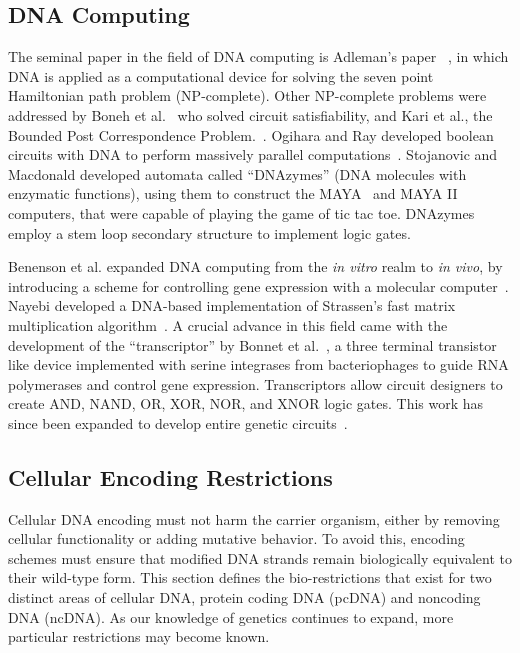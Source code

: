 \documentclass{bioinfo}
\begin{document}
\subsection{DNA Computing}

The seminal paper in the field of DNA computing is Adleman's paper ~\cite{ADLEMAN1994}, in which DNA is applied as a computational device for solving the seven point Hamiltonian path problem (NP-complete). Other NP-complete problems were addressed by Boneh et al.~\cite{BONEH1996} who  solved circuit satisfiability, and Kari et al., the Bounded Post Correspondence Problem.~\cite{KARI2000}. Ogihara and Ray developed boolean circuits with DNA to perform massively parallel computations~\cite{OGIHARA1999}. Stojanovic and Macdonald developed automata called ``DNAzymes'' (DNA molecules with enzymatic functions), using them to construct the MAYA~\cite{STOJANOVIC2003} and MAYA II~\cite{MACDONALD2006} computers, that were capable of playing the game of tic tac toe. DNAzymes employ a stem loop secondary structure to implement logic gates.

Benenson et al. expanded DNA computing from the \textit{in vitro} realm to \textit{in vivo}, by introducing a scheme for controlling gene expression with a molecular computer~\cite{BENENSON2004}. Nayebi developed a DNA-based implementation of Strassen's fast matrix multiplication algorithm~\cite{NAYEBI2009}. A crucial advance in this field came with the development of the ``transcriptor'' by Bonnet et al.~\cite{BONNET2013}, a three terminal transistor like device implemented with serine integrases from bacteriophages to guide RNA polymerases and control gene expression. Transcriptors allow circuit designers to create AND, NAND, OR, XOR, NOR, and XNOR logic gates. This work has since been expanded to develop entire genetic circuits~\cite{BROPHY2014,NIELSEN2016}.

\subsection{Cellular Encoding Restrictions}

Cellular DNA encoding must not harm the carrier organism, either by removing cellular functionality or adding mutative behavior. To avoid this, encoding schemes must ensure that modified DNA strands remain biologically equivalent to their wild-type form. This section defines the bio-restrictions that exist for two distinct areas of cellular DNA, protein coding DNA (pcDNA) and noncoding DNA (ncDNA). As our knowledge of genetics continues to expand, more particular restrictions may become known.
\end{document}
